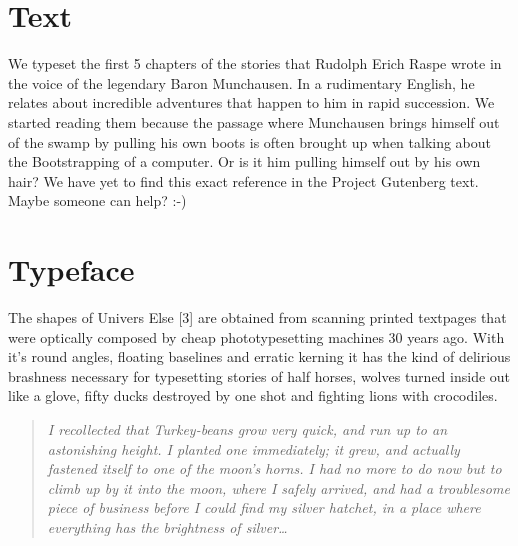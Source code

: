 \section*{Text}
We typeset the first 5 chapters of the stories that Rudolph Erich Raspe wrote
in the voice of the legendary Baron Munchausen. In a rudimentary English, he
relates about incredible adventures that happen to him in rapid succession. We
started reading them because the passage where Munchausen brings himself out
of the swamp by pulling his own boots is often brought up when talking about
the Bootstrapping of a computer. Or is it him pulling himself out by his own
hair? We have yet to find this exact reference in the Project Gutenberg text.
Maybe someone can help? :-)

\section*{Typeface}
The shapes of Univers Else [3] are obtained from scanning printed textpages
that were optically composed by cheap phototypesetting machines 30 years ago.
With it's round angles, floating baselines and erratic kerning it has the kind
of delirious brashness necessary for typesetting stories of half horses,
wolves turned inside out like a glove, fifty ducks destroyed by one shot and
fighting lions with crocodiles.

\begin{quote}
\textit{I recollected that Turkey-beans grow very quick, and run up to an
astonishing height. I planted one immediately; it grew, and actually fastened
itself to one of the moon's horns. I had no more to do now but to climb up by
it into the moon, where I safely arrived, and had a troublesome piece of
business before I could find my silver hatchet, in a place where everything
has the brightness of silver\dots}
\end{quote}
